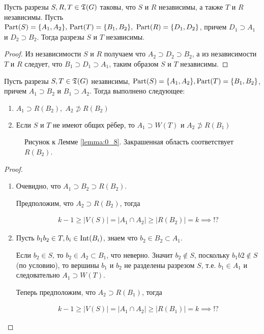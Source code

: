 \begin{customlm}{0.7} \label{lemma:0_7}
	Пусть разрезы $S, R, T \in \mathfrak{T}(G)$ таковы, что  $S$ и  $R$ независимы, а также $T$ и  $R$ независимы.
	Пусть  $\operatorname{Part}(S) = \{A_1, A_2\}, \, \operatorname{Part}(T) = \{B_1, B_2\}, \ \operatorname{Part}(R) = \{D_1, D_2\}$, причем $D_1 \supset A_1$ и $D_2 \supset B_2$.
	Тогда разрезы $S$ и  $T$ независимы.
\end{customlm}

\begin{proof}
	Из независимости $S$ и  $R$ получаем что  $A_2 \supset D_2 \supset B_2$, а из независимости $T$ и  $R$ следует, что  $B_1 \supset D_1 \supset A_1$, таким образом $S$ и  $T$ независимы.
\end{proof}

\begin{customlm}{0.8} \label{lemma:0_8}
	Пусть разрезы $S, T \in \mathfrak{T}(G)$ независимы,  $\operatorname{Part}(S) = \{A_1, A_2\}, \operatorname{Part}(T) = \{B_1, B_2\}$, причем $A_1 \supset B_2$ и $B_1 \supset A_2$. Тогда выполнено следующее:

	\begin{enumerate}
		\item $A_1 \supset R(B_2), \; A_2 \not \supset R(B_2)$
		\item Если $S$ и  $T$ не имеют общих рёбер, то  $A_1 \supset W(T)$ и $A_2 \not \supset R(B_1)$
	\end{enumerate}

\end{customlm}

\begin{figure}[ht]
	\centering
	\caption{Рисунок к Лемме \ref{lemma:0_8}. Закрашенная область соответствует $R(B_2)$.} 
	\label{fig:lemma_0_8}
\end{figure}


\begin{proof}
	\begin{enumerate}
		\item Очевидно, что $A_1 \supset B_2 \supset R(B_2)$.

		Предположим, что $A_2 \supset R(B_2)$, тогда 

		\begin{align*}
			k - 1 \geqslant |V(S)| = |A_1 \cap A_2| \geqslant |R(B_2)| = k \implies \text{!?}
		\end{align*}

		\item Пусть $b_1b_2 \in T, b_i \in \operatorname{Int}(B_i)$, знаем что $b_2 \in B_2 \subset A_1$.

			Если $b_2 \in S$, то $b_2 \in A_2 \subset B_1$, что неверно.
			Значит $b_2 \not \in S$, поскольку $b_1b2 \not \in S$(по условию), то вершины $b_1$ и $b_2$ не разделены разрезом $S$, т.е. $b_1 \in A_1$ и следовательно $A_1 \supset W(T)$.

			Теперь предположим, что $A_2 \supset R(B_1)$, тогда 

			\begin{align*}
				k - 1 \geqslant |V(S)| = |A_1 \cap A_2| \geqslant |R(B_1)| = k \implies \text{!?}
			\end{align*}

	\end{enumerate}
\end{proof}
